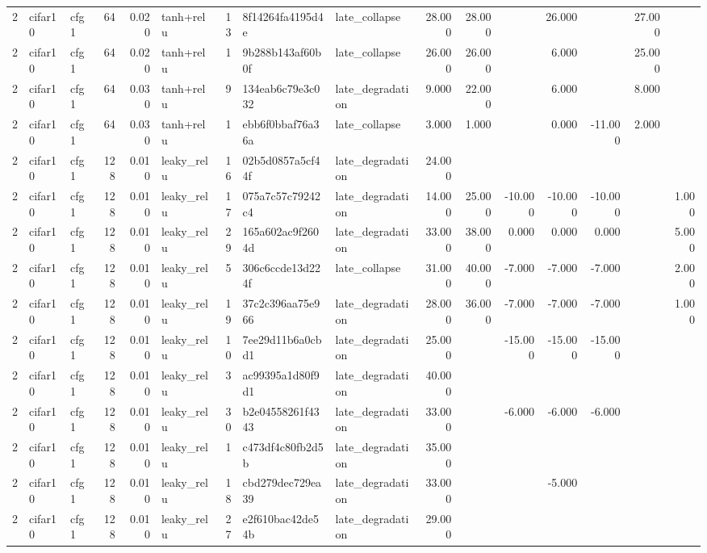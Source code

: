 \begin{table}[htbp]
{\begin{tabular}{@{}rllrrlrllrrrrrrr@{}}
2 & cifar10 & cfg1 & 64 & 0.020 & tanh+relu & 13 & 8f14264fa4195d4e & late\_collapse & 28.000 & 28.000 &  & 26.000 &  & 27.000 &  \\
2 & cifar10 & cfg1 & 64 & 0.020 & tanh+relu & 1 & 9b288b143af60b0f & late\_collapse & 26.000 & 26.000 &  & 6.000 &  & 25.000 &  \\
2 & cifar10 & cfg1 & 64 & 0.030 & tanh+relu & 9 & 134eab6c79e3c032 & late\_degradation & 9.000 & 22.000 &  & 6.000 &  & 8.000 &  \\
2 & cifar10 & cfg1 & 64 & 0.030 & tanh+relu & 1 & ebb6f0bbaf76a36a & late\_collapse & 3.000 & 1.000 &  & 0.000 & -11.000 & 2.000 &  \\
2 & cifar10 & cfg1 & 128 & 0.010 & leaky\_relu & 16 & 02b5d0857a5cf44f & late\_degradation & 24.000 &  &  &  &  &  &  \\
2 & cifar10 & cfg1 & 128 & 0.010 & leaky\_relu & 17 & 075a7c57c79242c4 & late\_degradation & 14.000 & 25.000 & -10.000 & -10.000 & -10.000 &  & 1.000 \\
2 & cifar10 & cfg1 & 128 & 0.010 & leaky\_relu & 29 & 165a602ac9f2604d & late\_degradation & 33.000 & 38.000 & 0.000 & 0.000 & 0.000 &  & 5.000 \\
2 & cifar10 & cfg1 & 128 & 0.010 & leaky\_relu & 5 & 306c6ccde13d224f & late\_collapse & 31.000 & 40.000 & -7.000 & -7.000 & -7.000 &  & 2.000 \\
2 & cifar10 & cfg1 & 128 & 0.010 & leaky\_relu & 19 & 37c2c396aa75e966 & late\_degradation & 28.000 & 36.000 & -7.000 & -7.000 & -7.000 &  & 1.000 \\
2 & cifar10 & cfg1 & 128 & 0.010 & leaky\_relu & 10 & 7ee29d11b6a0cbd1 & late\_degradation & 25.000 &  & -15.000 & -15.000 & -15.000 &  &  \\
2 & cifar10 & cfg1 & 128 & 0.010 & leaky\_relu & 3 & ac99395a1d80f9d1 & late\_degradation & 40.000 &  &  &  &  &  &  \\
2 & cifar10 & cfg1 & 128 & 0.010 & leaky\_relu & 30 & b2e04558261f4343 & late\_degradation & 33.000 &  & -6.000 & -6.000 & -6.000 &  &  \\
2 & cifar10 & cfg1 & 128 & 0.010 & leaky\_relu & 1 & c473df4c80fb2d5b & late\_degradation & 35.000 &  &  &  &  &  &  \\
2 & cifar10 & cfg1 & 128 & 0.010 & leaky\_relu & 18 & cbd279dec729ea39 & late\_degradation & 33.000 &  &  & -5.000 &  &  &  \\
2 & cifar10 & cfg1 & 128 & 0.010 & leaky\_relu & 27 & e2f610bac42de54b & late\_degradation & 29.000 &  &  &  &  &  &  \\

\end{tabular}}
\end{table}
